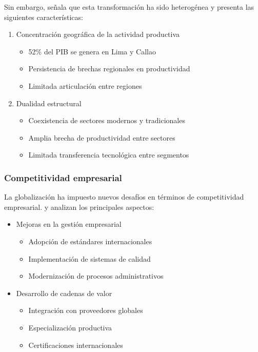 \documentclass[12pt, a4paper]{article}
\begin{document}
Sin embargo, \cite{gonzales2019} señala que esta transformación ha sido heterogénea y presenta las siguientes características:

\begin{enumerate}
    \item Concentración geográfica de la actividad productiva
    \begin{itemize}
        \item 52\% del PIB se genera en Lima y Callao
        \item Persistencia de brechas regionales en productividad
        \item Limitada articulación entre regiones
    \end{itemize}
    
    \item Dualidad estructural
    \begin{itemize}
        \item Coexistencia de sectores modernos y tradicionales
        \item Amplia brecha de productividad entre sectores
        \item Limitada transferencia tecnológica entre segmentos
    \end{itemize}
\end{enumerate}

\subsubsection{Competitividad empresarial}
La globalización ha impuesto nuevos desafíos en términos de competitividad empresarial. \cite{torres2021} y \cite{ramirez2020} analizan los principales aspectos:

\begin{itemize}
    \item Mejoras en la gestión empresarial
    \begin{itemize}
        \item Adopción de estándares internacionales
        \item Implementación de sistemas de calidad
        \item Modernización de procesos administrativos
    \end{itemize}
    
    \item Desarrollo de cadenas de valor
    \begin{itemize}
        \item Integración con proveedores globales
        \item Especialización productiva
        \item Certificaciones internacionales
    \end{itemize}
\end{itemize}
\end{document}
